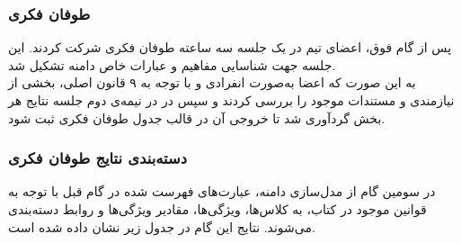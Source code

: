 \documentclass[12pt]{article}
\begin{document}
	\subsubsection{طوفان فکری}
	پس از گام فوق، اعضای تیم در یک جلسه سه ساعته طوفان فکری شرکت کردند. این جلسه جهت شناسایی مفاهیم و عبارات خاص دامنه تشکیل شد.\\
	به این صورت که اعضا به‌صورت انفرادی و با توجه به ۹ قانون اصلی، بخشی از نیازمندی و مستندات موجود را بررسی کردند و سپس در در نیمه‌ی دوم جلسه نتایج هر بخش گردآوری شد تا خروجی آن در قالب جدول طوفان فکری ثبت شود.

	\subsubsection{دسته‌بندی نتایج طوفان فکری}
	در سومین گام از مدل‌سازی دامنه، عبارت‌های فهرست شده در گام قبل با توجه به قوانین موجود در کتاب، به کلاس‌ها، ویژگی‌ها، مقادیر ویژگی‌ها و روابط دسته‌بندی می‌شوند.
	نتایج این گام در جدول زیر نشان داده شده است.
\end{document}
